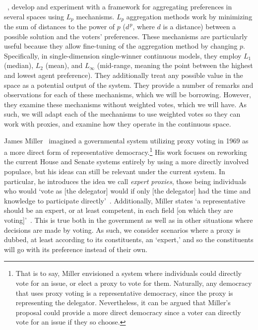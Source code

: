 ~\cite{Bulteau2021}, develop and experiment with a framework for
aggregating preferences in several spaces using $L_p$ mechanisms.
$L_p$ aggregation methods work by minimizing the sum of distances to the power of $p$
($d^{\,p}$, where $d$ is a distance) between a possible solution and the voters'
preferences.
These mechanisms are particularly useful because they allow fine-tuning of the
aggregation method by changing $p$.
Specifically, in single-dimension single-winner continuous models, they employ $L_1$
(median),
$L_2$ (mean), and $L_{\infty}$ (mid-range, meaning the point between the highest and
lowest agent preference).
They additionally treat any possible value in the space as a potential output of the
system.
They provide a number of remarks and observations for each of these mechanisms, which
we will be borrowing.
However, they examine these mechanisms without weighted votes, which we will have.
As such, we will adapt each of the mechanisms to use weighted votes so they can work
with proxies, and examine how they operate in the continuous space.

James Miller~\cite{Miller1969} imagined a governmental system utilizing proxy voting
in 1969 as a more direct form of representative democracy.\footnote{
    That is to say, Miller envisioned a system where individuals could directly vote
    for an issue, or elect a proxy to vote for them.
    Naturally, any democracy that uses proxy voting is a representative democracy,
    since the proxy is representing the delegator.
    Nevertheless, it can be argued that Miller's proposal could provide a more direct
    democracy since a voter can directly vote for an issue if they so choose.
}
His work focuses on reworking the current House and Senate systems entirely by using a
more directly involved populace, but his ideas can still be relevant under the current
system.
In particular, he introduces the idea we call \textit{expert proxies},
those being individuals who would `vote as [the delegator] would if only
[the delegator] had the time and knowledge to participate directly'~\cite{Miller1969}.
Additionally, Miller states `a representative should be an expert, or at least
competent, in each field [on which they are voting]'~\cite{Miller1969}.
This is true both in the government as well as in other situations where decisions are
made by voting.
As such, we consider scenarios where a proxy is dubbed, at least according to its
constituents, an `expert,' and so the constituents will go with its preference
instead of their own.
